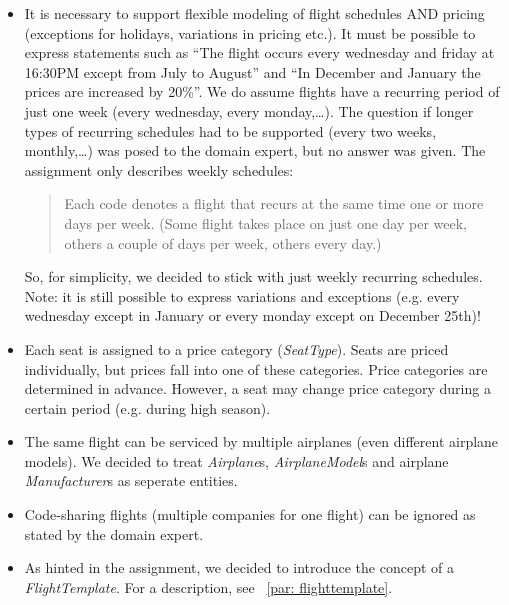 \documentclass[a4paper]{article}
\newcommand{\field}[1]{\emph{#1}}
\begin{document}
\begin{itemize}

\item It is necessary to support flexible modeling of flight schedules AND pricing (exceptions for holidays, variations in pricing etc.).
It must be possible to express statements such as ``The flight occurs every wednesday and friday at 16:30PM except from July to August'' and ``In December and January the prices are increased by 20\%''.
We do assume flights have a recurring period of just one week (every wednesday, every monday,\dots).
The question if longer types of recurring schedules had to be supported (every two weeks, monthly,\dots) was posed to the domain expert, but no answer was given.
The assignment only describes weekly schedules:

\begin{quote}
Each code denotes a flight that recurs at the same time one or more days per week.
(Some flight takes place on just one day per week, others a couple of days per week, others every day.)
\end{quote}

So, for simplicity,  we decided to stick with just weekly recurring schedules.
Note: it is still possible to express variations and exceptions (e.g. every wednesday except in January or every monday except on December 25th)! \\

\item Each seat is assigned to a price category (\field{SeatType}).
Seats are priced individually, but prices fall into one of these categories.
Price categories are determined in advance.
However, a seat may change price category during a certain period (e.g. during high season).

\item The same flight can be serviced by multiple airplanes (even different airplane models).
We decided to treat \field{Airplane}s, \field{AirplaneModel}s and airplane \field{Manufacturer}s as seperate entities.\\

\item Code-sharing flights (multiple companies for one flight) can be ignored as stated by the domain expert.\\

\item As hinted in the assignment, we decided to introduce the concept of a \field{FlightTemplate}.
For a description, see ~\ref{par: flighttemplate}. \\


\end{itemize}
\end{document}
